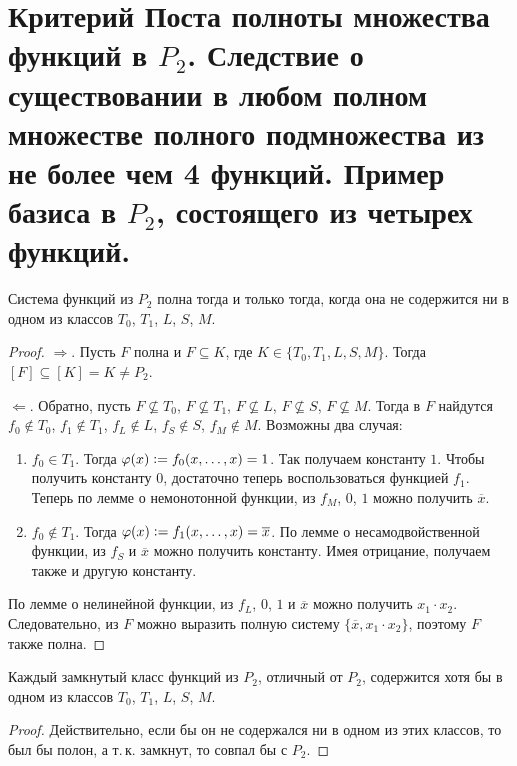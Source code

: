 \section{Критерий Поста полноты множества функций в $P_2$. Следствие о существовании в любом полном множестве полного подмножества из не более чем 4 функций. Пример базиса в $P_2$, состоящего из четырех функций.}

\begin{theorem}
    Система функций из $P_2$ полна тогда и только тогда, когда она не содержится ни в одном из классов $T_0$, $T_1$, $L$, $S$, $M$.
\end{theorem}

\begin{proof}
    $\Rightarrow$. Пусть $F$ полна и $F \subseteq K$, где $K \in \{T_0, T_1, L, S, M\}$. Тогда $[F] \subseteq [K] = K \ne P_2$.

    $\Leftarrow$. Обратно, пусть $F \not\subseteq T_0$, $F \not\subseteq T_1$, $F \not\subseteq L$, $F \not\subseteq S$, $F \not\subseteq M$. Тогда в $F$ найдутся $f_0 \notin T_0$, $f_1 \notin T_1$, $f_L \notin L$, $f_S \notin S$, $f_M \notin M$. Возможны два случая:
    \begin{enumerate}
        \item $f_0 \in T_1$. Тогда $\varphi(x) \vcentcolon = f_0(x, \ldots, x) = 1$. Так получаем константу $1$. Чтобы получить константу $0$, достаточно теперь воспользоваться функцией $f_1$. Теперь по лемме о немонотонной функции, из $f_M$, $0$, $1$ можно получить $\overline{x}$. 
        \item $f_0 \notin T_1$. Тогда $\varphi(x) \vcentcolon = f_1(x, \ldots, x) = \overline{x}$. По лемме о несамодвойственной функции, из $f_S$ и $\overline{x}$ можно получить константу. Имея отрицание, получаем также и другую константу.
    \end{enumerate}

    По лемме о нелинейной функции, из $f_L$, $0$, $1$ и $\overline{x}$ можно получить $x_1 \cdot x_2$. Следовательно, из $F$ можно выразить полную систему $\{\overline{x}, x_1 \cdot x_2\}$, поэтому $F$ также полна.
\end{proof}

\begin{corollary}
    Каждый замкнутый класс функций из $P_2$, отличный от $P_2$, содержится хотя бы в одном из классов $T_0$, $T_1$, $L$, $S$, $M$.
\end{corollary}

\begin{proof}
    Действительно, если бы он не содержался ни в одном из этих классов, то был бы полон, а т.\,к. замкнут, то совпал бы с $P_2$.
\end{proof}


